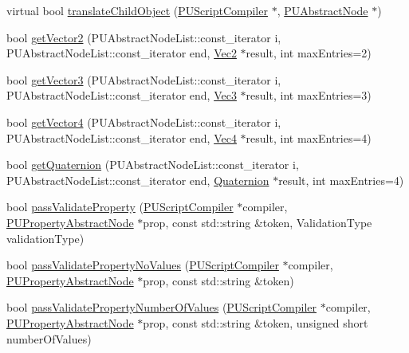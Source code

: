 \begin{DoxyCompactItemize}
\item 
virtual bool \hyperlink{classPUScriptTranslator_abd0b4087860ff1f66b41dc3a1f1eb1bb}{translate\+Child\+Object} (\hyperlink{classPUScriptCompiler}{P\+U\+Script\+Compiler} $\ast$, \hyperlink{classPUAbstractNode}{P\+U\+Abstract\+Node} $\ast$)
\item 
bool \hyperlink{classPUScriptTranslator_ab1b2552dcb55bfde190225ce5f9dabdc}{get\+Vector2} (P\+U\+Abstract\+Node\+List\+::const\+\_\+iterator i, P\+U\+Abstract\+Node\+List\+::const\+\_\+iterator end, \hyperlink{classVec2}{Vec2} $\ast$result, int max\+Entries=2)
\item 
bool \hyperlink{classPUScriptTranslator_a3362c25448c91a55aca1114c69ddbc97}{get\+Vector3} (P\+U\+Abstract\+Node\+List\+::const\+\_\+iterator i, P\+U\+Abstract\+Node\+List\+::const\+\_\+iterator end, \hyperlink{classVec3}{Vec3} $\ast$result, int max\+Entries=3)
\item 
bool \hyperlink{classPUScriptTranslator_a322d97ac1f6308ea0dda66b5b1c8b793}{get\+Vector4} (P\+U\+Abstract\+Node\+List\+::const\+\_\+iterator i, P\+U\+Abstract\+Node\+List\+::const\+\_\+iterator end, \hyperlink{classVec4}{Vec4} $\ast$result, int max\+Entries=4)
\item 
bool \hyperlink{classPUScriptTranslator_a0181ae407bbaabee7ea22cad4053c601}{get\+Quaternion} (P\+U\+Abstract\+Node\+List\+::const\+\_\+iterator i, P\+U\+Abstract\+Node\+List\+::const\+\_\+iterator end, \hyperlink{classQuaternion}{Quaternion} $\ast$result, int max\+Entries=4)
\item 
bool \hyperlink{classPUScriptTranslator_ab2fc7f172c43c3d64bc05d86ddc1bcb9}{pass\+Validate\+Property} (\hyperlink{classPUScriptCompiler}{P\+U\+Script\+Compiler} $\ast$compiler, \hyperlink{classPUPropertyAbstractNode}{P\+U\+Property\+Abstract\+Node} $\ast$prop, const std\+::string \&token, Validation\+Type validation\+Type)
\item 
bool \hyperlink{classPUScriptTranslator_a34528983a36a1a977b597354fd2e1db3}{pass\+Validate\+Property\+No\+Values} (\hyperlink{classPUScriptCompiler}{P\+U\+Script\+Compiler} $\ast$compiler, \hyperlink{classPUPropertyAbstractNode}{P\+U\+Property\+Abstract\+Node} $\ast$prop, const std\+::string \&token)
\item 
bool \hyperlink{classPUScriptTranslator_aef77b0acaa2bc43fb6d59eb4f4484e72}{pass\+Validate\+Property\+Number\+Of\+Values} (\hyperlink{classPUScriptCompiler}{P\+U\+Script\+Compiler} $\ast$compiler, \hyperlink{classPUPropertyAbstractNode}{P\+U\+Property\+Abstract\+Node} $\ast$prop, const std\+::string \&token, unsigned short number\+Of\+Values)

\end{DoxyCompactItemize}
